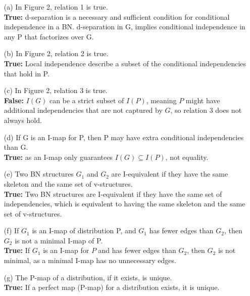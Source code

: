 \documentclass[a3paper,12pt]{extarticle} %
\begin{document}
\begin{enumerate}
    \begin{enumerate}
        \item[(a)] In Figure 2, relation 1 is true.
        \\ \textbf{True:} d-separation is a necessary and sufficient condition for conditional independence in a BN. d-separation in G, implies conditional independence in any P that factorizes over G.
        \item[(b)] In Figure 2, relation 2 is true.
        \\ \textbf{True:}  Local independence describe a subset of the conditional independencies that hold in P. 
        \item[(c)] In Figure 2, relation 3 is true.
        \\ \textbf{False:} \(I(G)\) can be a strict subset of \(I(P)\), meaning \(P\) might have additional independencies that are not captured by \(G\), so relation 3 does not always hold.      
        \item[(d)] If G is an I-map for P, then P may have extra conditional independencies than G.
        \\ \textbf{True:} as an I-map only guarantees \(I(G) \subseteq I(P)\), not equality.
        \item[(e)] Two BN structures $G_1$ and $G_2$ are I-equivalent if they have the same skeleton and the same set of v-structures.
        \\ \textbf{True:} Two BN structures are I-equivalent if they have the same set of independencies, which is equivalent to having the same skeleton and the same set of v-structures.
        \item[(f)] If $G_1$ is an I-map of distribution P, and $G_1$ has fewer edges than $G_2$, then $G_2$ is not a minimal I-map of P.
        \\ \textbf{True:} If \(G_1\) is an I-map for \(P\) and has fewer edges than \(G_2\), then \(G_2\) is not minimal, as a minimal I-map has no unnecessary edges.    
        \item[(g)] The P-map of a distribution, if it exists, is unique.
        \\ \textbf{True:} If a perfect map (P-map) for a distribution exists, it is unique.
    \end{enumerate}
\end{enumerate}
\newpage
\end{document}

